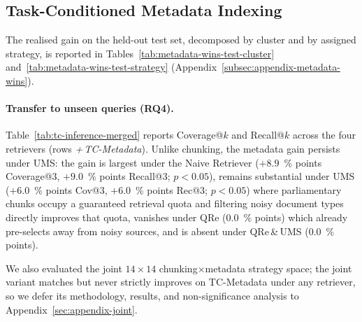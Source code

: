 \subsection{Task-Conditioned Metadata Indexing}
\label{sec:metadata-results}
The realised gain on the held-out test set, decomposed by cluster and by
assigned strategy, is reported in
Tables~\ref{tab:metadata-wins-test-cluster} and~\ref{tab:metadata-wins-test-strategy}
(Appendix~\ref{subsec:appendix-metadata-wins}).

\paragraph{Transfer to unseen queries (RQ4).}

Table~\ref{tab:tc-inference-merged} reports
Coverage@$k$ and Recall@$k$ across the four retrievers (rows
\textit{+\,TC-Metadata}). Unlike chunking, the metadata gain persists under UMS: the gain is
largest under the Naive Retriever ($+8.9$~\% points Coverage@3, $+9.0$~\% points
Recall@3; $p<0.05$), remains substantial under UMS ($+6.0$~\% points Cov@3,
$+6.0$~\% points Rec@3; $p<0.05$) where parliamentary chunks occupy a
guaranteed retrieval quota and filtering noisy document types directly
improves that quota, vanishes under QRe ($0.0$~\% points) which already
pre-selects away from noisy sources, and is absent under
QRe\,\&\,UMS ($0.0$~\% points).

We also evaluated the joint $14{\times}14$ chunking$\times$metadata
strategy space; the joint variant matches but never strictly improves on
TC-Metadata under any retriever, so we defer its methodology, results,
and non-significance analysis to
Appendix~\ref{sec:appendix-joint}.


